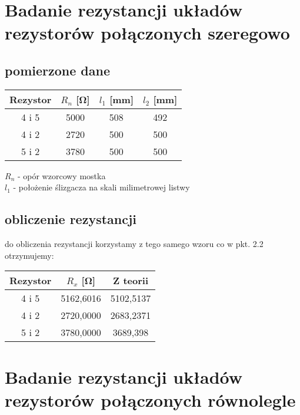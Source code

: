 \documentclass{article}
\begin{document}
\section{Badanie rezystancji układów rezystorów połączonych szeregowo}
\subsection{pomierzone dane}
\begin{center}
\begin{tabular}{ c |  c | c | c}
Rezystor & $R_n$ [\si{\ohm}] & $l_1$ [mm] & $l_2$ [mm]\\
\hline
 4 i 5 & 5000 & 508 & 492\\ 
 4 i 2 & 2720 & 500 & 500\\ 
 5 i 2 & 3780 & 500 & 500\\ 

\end{tabular}
\end{center}
$R_n$ - opór wzorcowy mostka\\ 
$l_1$ - położenie ślizgacza na skali milimetrowej listwy\\

\subsection{obliczenie rezystancji}
do obliczenia rezystancji korzystamy z tego samego wzoru co w pkt. 2.2\\
otrzymujemy: \\

\begin{center}
\begin{tabular}{ c | c | c}
Rezystor & $R_x$ [\si{\ohm}] & Z teorii\\
\hline
 4 i 5    & 5162,6016 &  5102,5137\\ 
 4 i 2    & 2720,0000 & 2683,2371\\ 
 5 i 2  & 3780,0000 & 3689,398\\ 

 
\end{tabular}
\end{center}


\section{Badanie rezystancji układów rezystorów połączonych równolegle}
\end{document}
